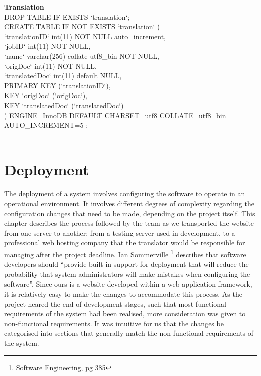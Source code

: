 \documentclass{l3proj}
\begin{document}
{\textbf{Translation}
\\
DROP TABLE IF EXISTS `translation`;\\
CREATE TABLE IF NOT EXISTS `translation` (\\
  `translationID` int(11) NOT NULL auto\_increment,\\
  `jobID` int(11) NOT NULL,\\
  `name` varchar(256) collate utf8\_bin NOT NULL,\\
  `origDoc` int(11) NOT NULL,\\
  `translatedDoc` int(11) default NULL,\\
  PRIMARY KEY  (`translationID`),\\
  KEY `origDoc` (`origDoc`),\\
  KEY `translatedDoc` (`translatedDoc`)\\
) ENGINE=InnoDB  DEFAULT CHARSET=utf8 COLLATE=utf8\_bin AUTO\_INCREMENT=5 ;\\
\\
}

\chapter{Deployment}
\label{chap:deply}
The deployment of a system involves configuring the software to operate in an operational 
environment. It involves different degrees of complexity regarding the configuration
changes that need to be made, depending on the project itself. This chapter describes 
the process followed by the team as we transported the website from one server to another: 
from a testing server used in development, to a professional web hosting company
that the translator would be responsible for managing after the project deadline.\newline
Ian Sommerville \footnote{Software Engineering, pg 385} describes that software developers 
should ``provide built-in support for deployment that will reduce the probability that system 
administrators will make mistakes when configuring the software''. Since ours is a 
website developed within a web application framework, it is relatively easy to make the
changes to accommodate this process. As the project neared the end of development stages, such
that most functional requirements of the system had been realised, more consideration was given
to non-functional requirements. It was intuitive for us that the changes be categorised 
into sections that generally match the non-functional requirements of the system.
\end{document}

